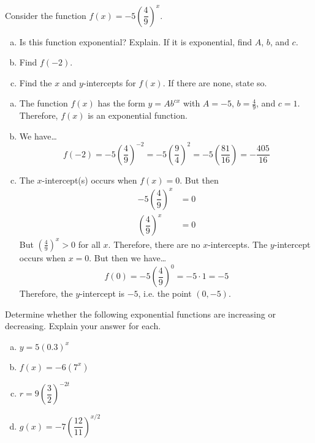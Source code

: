 \documentclass[11pt,letterpaper]{article}
\begin{document}

 Consider the function $f(x)= -5 \left( \dfrac{4}{9} \right)^x$. 
	\begin{enumerate}[(a)]
	\item Is this function exponential? Explain. If it is exponential, find $A$, $b$, and $c$.
	\item Find $f(-2)$. 
	\item Find the $x$ and $y$-intercepts for $f(x)$. If there are none, state so. 
	\end{enumerate} \pspace

\sol
\begin{enumerate}[(a)]
\item The function $f(x)$ has the form $y= Ab^{cx}$ with $A= -5$, $b= \frac{4}{9}$, and $c= 1$. Therefore, $f(x)$ is an exponential function. 

\item We have\dots
	\[
	f(-2)= -5 \left( \dfrac{4}{9} \right)^{-2}= -5 \left( \dfrac{9}{4} \right)^2= -5 \left( \dfrac{81}{16} \right)= -\dfrac{405}{16}
	\]

\item The $x$-intercept(s) occurs when $f(x)= 0$. But then 
	\[
	\begin{aligned}
	-5 \left( \dfrac{4}{9} \right)^x&= 0 \\
	\left( \dfrac{4}{9} \right)^x&= 0
	\end{aligned}
	\]
But $\left( \frac{4}{9} \right)^x > 0$ for all $x$. Therefore, there are no $x$-intercepts. The $y$-intercept occurs when $x= 0$. But then we have\dots
	\[
	f(0)= -5 \left( \dfrac{4}{9} \right)^0= -5 \cdot 1= -5 
	\]
Therefore, the $y$-intercept is $-5$, i.e. the point $(0, -5)$. 
\end{enumerate}



\newpage



 Determine whether the following exponential functions are increasing or decreasing. Explain your answer for each.
	\begin{enumerate}[(a)]
	\item $y= 5(0.3)^x$
	\item $f(x)= -6(7^x)$
	\item $r= 9 \left(\dfrac{3}{2} \right)^{-2t}$
	\item $g(x)= -7 \left( \dfrac{12}{11} \right)^{x/2}$
	\end{enumerate} \pspace
\end{document}
